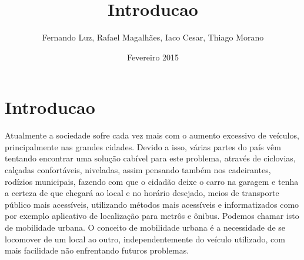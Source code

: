 \documentclass{article}
\title{Introducao}
\author{Fernando Luz, Rafael Magalhães, Iaco Cesar, Thiago Morano}
\date{Fevereiro 2015}
\begin{document}
\maketitle
\section{Introducao}
Atualmente a sociedade sofre cada vez mais com o aumento excessivo de veículos, principalmente nas grandes cidades. Devido a isso, várias partes do país vêm tentando encontrar uma solução cabível para este problema, através de ciclovias, calçadas confortáveis, niveladas, assim pensando também nos cadeirantes, rodízios municipais, fazendo com que o cidadão deixe o carro na garagem e tenha a certeza de que chegará ao local e no horário desejado, meios de transporte público mais acessíveis, utilizando métodos mais acessíveis e informatizados como por exemplo aplicativo de localização para metrôs e ônibus. Podemos chamar isto de mobilidade urbana. O conceito de mobilidade urbana é a necessidade de se locomover de um local ao outro, independentemente do veículo utilizado, com mais facilidade não enfrentando futuros problemas. 
\end{document}
